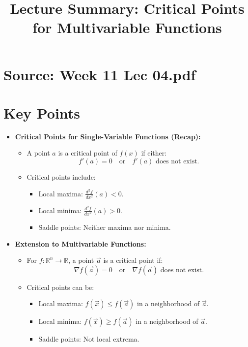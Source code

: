 \documentclass{article}
\title{Lecture Summary: Critical Points for Multivariable Functions}
\author{}
\date{}
\begin{document}
\maketitle

\section*{Source: Week 11 Lec 04.pdf}

\section*{Key Points}

\begin{itemize}
  \item \textbf{Critical Points for Single-Variable Functions (Recap):}
    \begin{itemize}
      \item A point $a$ is a critical point of $f(x)$ if either:
        \[
          f'(a) = 0 \quad \text{or} \quad f'(a) \text{ does not exist}.
        \]
      \item Critical points include:
        \begin{itemize}
          \item Local maxima: $\frac{d^2f}{dx^2}(a) < 0$.
          \item Local minima: $\frac{d^2f}{dx^2}(a) > 0$.
          \item Saddle points: Neither maxima nor minima.
        \end{itemize}
    \end{itemize}

  \item \textbf{Extension to Multivariable Functions:}
    \begin{itemize}
      \item For $f: \mathbb{R}^n \to \mathbb{R}$, a point $\vec{a}$ is a critical point if:
        \[
          \nabla f(\vec{a}) = 0 \quad \text{or} \quad \nabla f(\vec{a}) \text{ does not exist}.
        \]
      \item Critical points can be:
        \begin{itemize}
          \item Local maxima: $f(\vec{x}) \leq f(\vec{a})$ in a neighborhood of $\vec{a}$.
          \item Local minima: $f(\vec{x}) \geq f(\vec{a})$ in a neighborhood of $\vec{a}$.
          \item Saddle points: Not local extrema.
        \end{itemize}
    \end{itemize}


\end{itemize}
\end{document}
